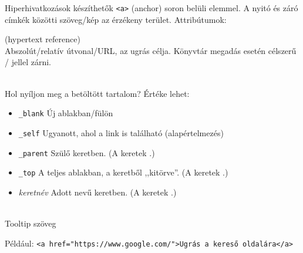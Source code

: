 \begin{frame}
  \footnotesize
  Hiperhivatkozások készíthetők \texttt{<a>} (anchor) soron belüli elemmel. A nyitó és záró címkék közötti szöveg/kép az érzékeny terület. Attribútumok:
  \begin{description}[m]
    \item[\texttt{href}] (hypertext reference) \hfill \\ Abszolút/relatív útvonal/URL, az ugrás célja. Könyvtár megadás esetén célszerű / jellel zárni.
    \item[\texttt{target}] \hfill \\ Hol nyíljon meg a betöltött tartalom? Értéke lehet:
    \begin{itemize}
      \item \texttt{\_blank} Új ablakban/fülön
      \item \texttt{\_self} Ugyanott, ahol a link is található (alapértelmezés)
      \item \texttt{\_parent} Szülő keretben. (A keretek .)
      \item \texttt{\_top} A teljes ablakban, a keretből ,,kitörve''. (A keretek .)
      \item \emph{keretnév} Adott nevű keretben. (A keretek .)
    \end{itemize}
    \item[\texttt{title}] \hfill \\ Tooltip szöveg
  \end{description}
  Például: \texttt{<a href="https://www.google.com/">Ugrás a kereső oldalára</a>}
\end{frame}


